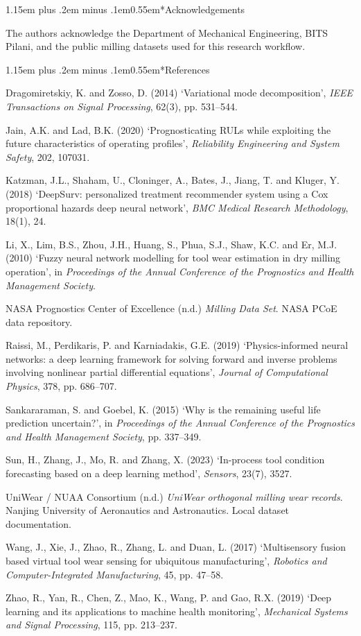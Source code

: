 \documentclass[10pt]{article}
\makeatletter
\renewcommand\section{\@startsection{section}{1}{0pt}%
  {1.15em plus .2em minus .1em}{0.55em}{\normalfont\normalsize\bfseries}}
\makeatother
\begin{document}
\clearpage
\section*{Acknowledgements}

The authors acknowledge the Department of Mechanical Engineering, BITS Pilani, and the public milling datasets used for this research workflow.

\section*{References}

\footnotesize
\setlength{\parindent}{0pt}
\setlength{\parskip}{0.35em}

Dragomiretskiy, K. and Zosso, D. (2014) `Variational mode decomposition', \textit{IEEE Transactions on Signal Processing}, 62(3), pp. 531--544.

Jain, A.K. and Lad, B.K. (2020) `Prognosticating RULs while exploiting the future characteristics of operating profiles', \textit{Reliability Engineering and System Safety}, 202, 107031.

Katzman, J.L., Shaham, U., Cloninger, A., Bates, J., Jiang, T. and Kluger, Y. (2018) `DeepSurv: personalized treatment recommender system using a Cox proportional hazards deep neural network', \textit{BMC Medical Research Methodology}, 18(1), 24.

Li, X., Lim, B.S., Zhou, J.H., Huang, S., Phua, S.J., Shaw, K.C. and Er, M.J. (2010) `Fuzzy neural network modelling for tool wear estimation in dry milling operation', in \textit{Proceedings of the Annual Conference of the Prognostics and Health Management Society}.

NASA Prognostics Center of Excellence (n.d.) \textit{Milling Data Set}. NASA PCoE data repository.

Raissi, M., Perdikaris, P. and Karniadakis, G.E. (2019) `Physics-informed neural networks: a deep learning framework for solving forward and inverse problems involving nonlinear partial differential equations', \textit{Journal of Computational Physics}, 378, pp. 686--707.

Sankararaman, S. and Goebel, K. (2015) `Why is the remaining useful life prediction uncertain?', in \textit{Proceedings of the Annual Conference of the Prognostics and Health Management Society}, pp. 337--349.

Sun, H., Zhang, J., Mo, R. and Zhang, X. (2023) `In-process tool condition forecasting based on a deep learning method', \textit{Sensors}, 23(7), 3527.

UniWear / NUAA Consortium (n.d.) \textit{UniWear orthogonal milling wear records}. Nanjing University of Aeronautics and Astronautics. Local dataset documentation.

Wang, J., Xie, J., Zhao, R., Zhang, L. and Duan, L. (2017) `Multisensory fusion based virtual tool wear sensing for ubiquitous manufacturing', \textit{Robotics and Computer-Integrated Manufacturing}, 45, pp. 47--58.

Zhao, R., Yan, R., Chen, Z., Mao, K., Wang, P. and Gao, R.X. (2019) `Deep learning and its applications to machine health monitoring', \textit{Mechanical Systems and Signal Processing}, 115, pp. 213--237.
\end{document}
